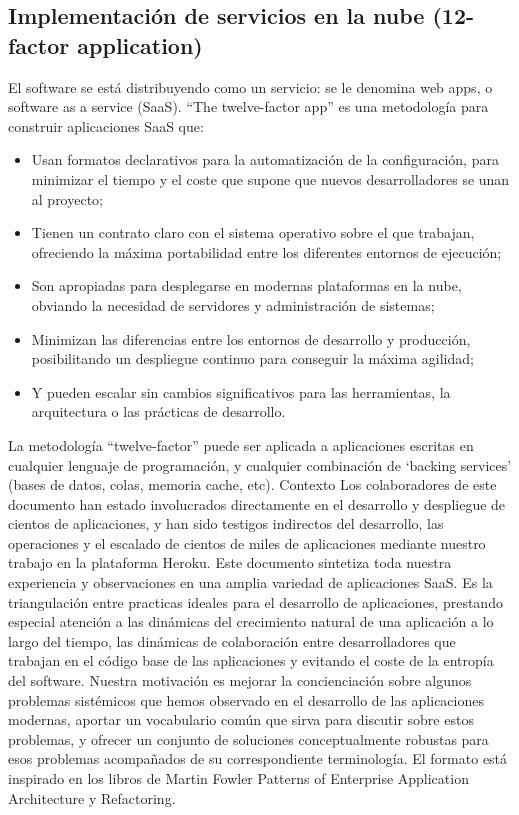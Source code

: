 \documentclass[12pt]{article}
\begin{document}
\subsection*{Implementación de servicios en la nube (12-factor application)}
El software se está distribuyendo como un servicio: se le denomina web apps, o software as a service (SaaS). “The twelve-factor app” es una metodología para construir aplicaciones SaaS que:
\begin{itemize}
\item Usan formatos declarativos para la automatización de la configuración, para minimizar el tiempo y el coste que supone que nuevos desarrolladores se unan al proyecto;
\item Tienen un contrato claro con el sistema operativo sobre el que trabajan, ofreciendo la máxima portabilidad entre los diferentes entornos de ejecución;
\item Son apropiadas para desplegarse en modernas plataformas en la nube, obviando la necesidad de servidores y administración de sistemas;
\item Minimizan las diferencias entre los entornos de desarrollo y producción, posibilitando un despliegue continuo para conseguir la máxima agilidad;
\item Y pueden escalar sin cambios significativos para las herramientas, la arquitectura o las prácticas de desarrollo.
\end{itemize}
La metodología “twelve-factor” puede ser aplicada a aplicaciones escritas en cualquier lenguaje de programación, y cualquier combinación de ‘backing services’ (bases de datos, colas, memoria cache, etc).
Contexto
Los colaboradores de este documento han estado involucrados directamente en el desarrollo y despliegue de cientos de aplicaciones, y han sido testigos indirectos del desarrollo, las operaciones y el escalado de cientos de miles de aplicaciones mediante nuestro trabajo en la plataforma Heroku.
Este documento sintetiza toda nuestra experiencia y observaciones en una amplia variedad de aplicaciones SaaS. Es la triangulación entre practicas ideales para el desarrollo de aplicaciones, prestando especial atención a las dinámicas del crecimiento natural de una aplicación a lo largo del tiempo, las dinámicas de colaboración entre desarrolladores que trabajan en el código base de las aplicaciones y evitando el coste de la entropía del software.
Nuestra motivación es mejorar la concienciación sobre algunos problemas sistémicos que hemos observado en el desarrollo de las aplicaciones modernas, aportar un vocabulario común que sirva para discutir sobre estos problemas, y ofrecer un conjunto de soluciones conceptualmente robustas para esos problemas acompañados de su correspondiente terminología. El formato está inspirado en los libros de Martin Fowler Patterns of Enterprise Application Architecture y Refactoring.
\end{document}
